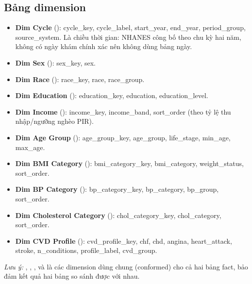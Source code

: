 \subsection{Bảng dimension}
\begin{itemize}
\item \textbf{Dim Cycle} (): cycle\_key, cycle\_label, start\_year, end\_year, period\_group, source\_system. Là chiều thời gian: NHANES công bố theo chu kỳ hai năm, không có ngày khám chính xác nên không dùng bảng ngày.
\item \textbf{Dim Sex} (): sex\_key, sex.
\item \textbf{Dim Race} (): race\_key, race, race\_group.
\item \textbf{Dim Education} (): education\_key, education, education\_level.
\item \textbf{Dim Income} (): income\_key, income\_band, sort\_order (theo tỷ lệ thu nhập/ngưỡng nghèo PIR).
\item \textbf{Dim Age Group} (): age\_group\_key, age\_group, life\_stage, min\_age, max\_age.
\item \textbf{Dim BMI Category} (): bmi\_category\_key, bmi\_category, weight\_status, sort\_order.
\item \textbf{Dim BP Category} (): bp\_category\_key, bp\_category, bp\_group, sort\_order.
\item \textbf{Dim Cholesterol Category} (): chol\_category\_key, chol\_category, sort\_order.
\item \textbf{Dim CVD Profile} (): cvd\_profile\_key, chf, chd, angina, heart\_attack, stroke, n\_conditions, profile\_label, cvd\_group.
\end{itemize}
\emph{Lưu ý:} , , ,  và  là các dimension dùng chung (conformed) cho cả hai bảng fact, bảo đảm kết quả hai bảng so sánh được với nhau.

